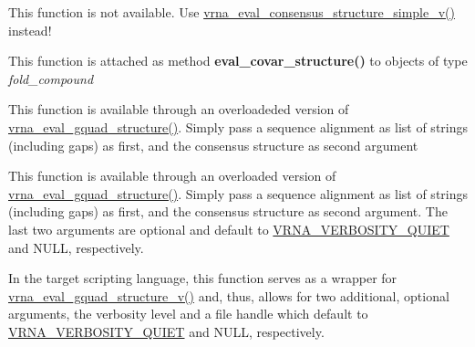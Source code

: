 \begin{DoxyRefList}
%
 This function is not available. Use \mbox{\hyperlink{group__eval_gad88927c62ab0a8b534e078e44be1b36e}{vrna\+\_\+eval\+\_\+consensus\+\_\+structure\+\_\+simple\+\_\+v()}} instead!  
\item[Global \mbox{\hyperlink{group__eval_ga6cea75c0eb9857fb59172be54cab09e0}{vrna\+\_\+eval\+\_\+covar\+\_\+structure}} (vrna\+\_\+fold\+\_\+compound\+\_\+t $\ast$vc, const char $\ast$structure)]\label{wrappers__wrappers000047}%
%
 This function is attached as method {\bfseries{eval\+\_\+covar\+\_\+structure()}} to objects of type {\itshape fold\+\_\+compound}  
\item[Global \mbox{\hyperlink{group__eval_gaf09a326b3d57a4b30c27bd0e216198ac}{vrna\+\_\+eval\+\_\+gquad\+\_\+consensus\+\_\+structure}} (const char $\ast$$\ast$alignment, const char $\ast$structure)]\label{wrappers__wrappers000059}%
%
 This function is available through an overloadeded version of \mbox{\hyperlink{group__eval_ga3263504825ef4b523eba797c99921df4}{vrna\+\_\+eval\+\_\+gquad\+\_\+structure()}}. Simply pass a sequence alignment as list of strings (including gaps) as first, and the consensus structure as second argument  
\item[Global \mbox{\hyperlink{group__eval_ga8abc794fc48d43268ced5e8cde017baa}{vrna\+\_\+eval\+\_\+gquad\+\_\+consensus\+\_\+structure\+\_\+v}} (const char $\ast$$\ast$alignment, const char $\ast$structure, int verbosity\+\_\+level, F\+I\+LE $\ast$file)]\label{wrappers__wrappers000069}%
%
 This function is available through an overloaded version of \mbox{\hyperlink{group__eval_ga3263504825ef4b523eba797c99921df4}{vrna\+\_\+eval\+\_\+gquad\+\_\+structure()}}. Simply pass a sequence alignment as list of strings (including gaps) as first, and the consensus structure as second argument. The last two arguments are optional and default to \mbox{\hyperlink{group__eval_gaf4afe19780b61b4962c613bde324128b}{V\+R\+N\+A\+\_\+\+V\+E\+R\+B\+O\+S\+I\+T\+Y\+\_\+\+Q\+U\+I\+ET}} and N\+U\+LL, respectively.  
\item[Global \mbox{\hyperlink{group__eval_ga3263504825ef4b523eba797c99921df4}{vrna\+\_\+eval\+\_\+gquad\+\_\+structure}} (const char $\ast$string, const char $\ast$structure)]\label{wrappers__wrappers000055}%
%
 In the target scripting language, this function serves as a wrapper for \mbox{\hyperlink{group__eval_gaeaa2bdbc1b5d78c667e735fbdff87fff}{vrna\+\_\+eval\+\_\+gquad\+\_\+structure\+\_\+v()}} and, thus, allows for two additional, optional arguments, the verbosity level and a file handle which default to \mbox{\hyperlink{group__eval_gaf4afe19780b61b4962c613bde324128b}{V\+R\+N\+A\+\_\+\+V\+E\+R\+B\+O\+S\+I\+T\+Y\+\_\+\+Q\+U\+I\+ET}} and N\+U\+LL, respectively.  

\end{DoxyRefList}
